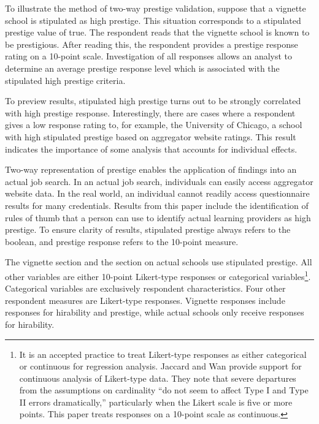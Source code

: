\documentclass[review]{elsarticle}
\begin{document}
To illustrate the method of two-way prestige validation,
suppose that a vignette school is stipulated as high prestige.
This situation corresponds to a stipulated prestige value of true.
The respondent reads that the vignette school is known to be prestigious.
After reading this, the respondent provides a prestige response rating on a 10-point scale.
Investigation of all responses allows an analyst to determine an average prestige response level which is associated with
the stipulated high prestige criteria.

To preview results, stipulated high prestige turns out to be strongly correlated with high prestige response.
Interestingly, there are cases where a respondent gives a low response rating to, for example,
the University of Chicago, a school with high stipulated prestige based on aggregator website ratings.
This result indicates the importance of some analysis that accounts for individual effects.

Two-way representation of prestige enables the application of findings into an actual job search.
In an actual job search, individuals can easily access aggregator website data.
In the real world, an individual cannot readily access questionnaire results for many credentials.
Results from this paper include the identification of rules of thumb
that a person can use to identify actual learning providers as high prestige.
To ensure clarity of results, stipulated prestige always refers to the boolean, and prestige response refers to the 10-point measure.

The vignette section and the section on actual schools use stipulated prestige.
All other variables are either 10-point Likert-type responses or categorical variables\footnote{
    It is an accepted practice to treat Likert-type responses as either categorical or continuous for regression analysis.
    Jaccard and Wan provide support for continuous analysis of Likert-type data.
    They note that severe departures from the assumptions on cardinality ``do not seem to affect Type I and Type II errors dramatically,''
    particularly when the Likert scale is five or more points\cite{jaccard1996lisrel}.
    This paper treats responses on a 10-point scale as continuous.
}.
Categorical variables are exclusively respondent characteristics.
Four other respondent measures are Likert-type responses.
Vignette responses include responses for hirability and prestige,
while actual schools only receive responses for hirability.
\end{document}
